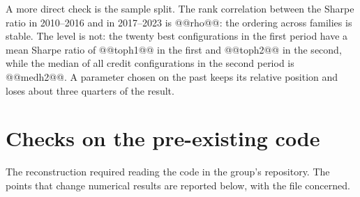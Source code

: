 \documentclass[11pt,a4paper]{article}
\begin{document}
A more direct check is the sample split. The rank correlation between the Sharpe ratio in 2010--2016 and in 2017--2023 is @@rho@@: the ordering across families is stable. The level is not: the twenty best configurations in the first period have a mean Sharpe ratio of @@toph1@@ in the first and @@toph2@@ in the second, while the median of all credit configurations in the second period is @@medh2@@. A parameter chosen on the past keeps its relative position and loses about three quarters of the result.

\section{Checks on the pre-existing code}\label{sec:codice}

The reconstruction required reading the code in the group's repository. The points that change numerical results are reported below, with the file concerned.
\end{document}
